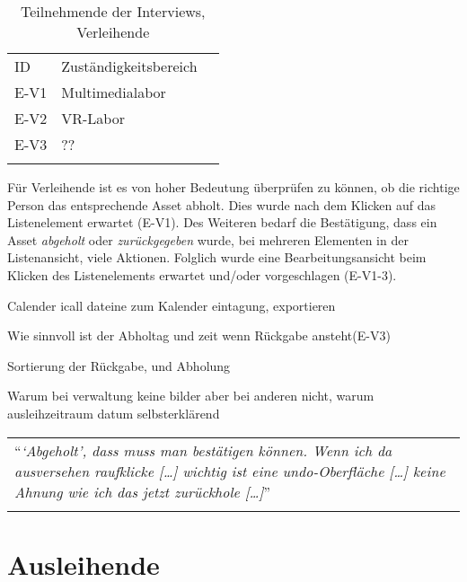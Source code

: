 \begin{table}[h]
  \centering
  \caption{Teilnehmende der Interviews, Verleihende}
  \begin{tabular}{lll}
    \arrayrulecolor{maincolor}\hline
    \sffamily\color{maincolor}ID &
    \sffamily\color{maincolor}Zuständigkeitsbereich \\
    \arrayrulecolor{maincolor}\hline
    E-V1                         & Multimedialabor  \\
    E-V2                         & VR-Labor         \\
    E-V3                         & ??               \\
    \arrayrulecolor{maincolor}\hline
  \end{tabular}
  \label{table:vzwei}
\end{table}

Für Verleihende ist es von hoher Bedeutung überprüfen zu können, ob die richtige
Person das entsprechende Asset abholt. Dies wurde nach dem Klicken auf das
Listenelement erwartet (E-V1). Des Weiteren bedarf die Bestätigung, dass ein
Asset \textit{abgeholt} oder \textit{zurückgegeben} wurde, bei mehreren
Elementen in der Listenansicht, viele Aktionen. Folglich wurde eine
Bearbeitungsansicht beim Klicken des Listenelements erwartet und/oder vorgeschlagen
(E-V1-3).


Calender icall dateine zum Kalender eintagung, exportieren

Wie sinnvoll ist der Abholtag und zeit wenn Rückgabe ansteht(E-V3)


Sortierung der Rückgabe, und Abholung


Warum bei verwaltung keine bilder aber bei anderen nicht, warum ausleihzeitraum  datum selbsterklärend

\begin{longtable}{p{}} \arrayrulecolor{maincolor}\hline
  \enquote{\textit{\enquote{Abgeholt}, dass muss man bestätigen können. Wenn ich
  da ausversehen raufklicke [\dots] wichtig ist eine undo-Oberfläche [\dots]
  keine Ahnung wie ich das jetzt zurückhole [\dots]}} \\
  \arrayrulecolor{maincolor}\hline
\end{longtable}

\section{Ausleihende}

